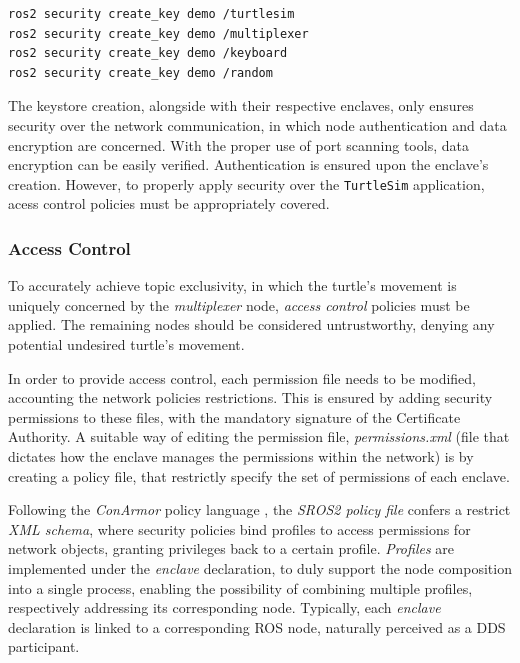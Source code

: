 \begin{lstlisting}[title={\texttt{TurtleSim} enclave creation.}]
ros2 security create_key demo /turtlesim
ros2 security create_key demo /multiplexer
ros2 security create_key demo /keyboard
ros2 security create_key demo /random
\end{lstlisting}

The keystore creation, alongside with their respective enclaves, only ensures security over the network communication, in which node authentication and data encryption are concerned. With the proper use of port scanning tools, data encryption can be easily verified. Authentication is ensured upon the enclave's creation. However, to properly apply security over the \texttt{TurtleSim} application, acess control policies must be appropriately covered.

\subsubsection{Access Control}

To accurately achieve topic exclusivity, in which the turtle's movement is uniquely concerned by the \textit{multiplexer} node, \textit{access control} policies must be applied. The remaining nodes should be considered untrustworthy, denying any potential undesired turtle's movement.
            
In order to provide access control, each permission file needs to be modified, accounting the network policies restrictions. This is ensured by adding security permissions to these files, with the mandatory signature of the Certificate Authority. A suitable way of editing the permission file, \textit{permissions.xml} (file that dictates how the enclave manages the permissions within the network) is by creating a policy file, that restrictly specify the set of permissions of each enclave.

Following the \textit{ConArmor} policy language \cite{white2018procedurally}, the \textit{SROS2 policy file} confers a restrict \textit{XML schema}, where security policies bind profiles to access permissions for network objects, granting privileges back to a certain profile. \textit{Profiles} are implemented under the \textit{enclave} declaration, to duly support the node composition into a single process, enabling the possibility of combining multiple profiles, respectively addressing its corresponding node. Typically, each \textit{enclave} declaration is linked to a corresponding ROS node, naturally perceived as a DDS participant. 

